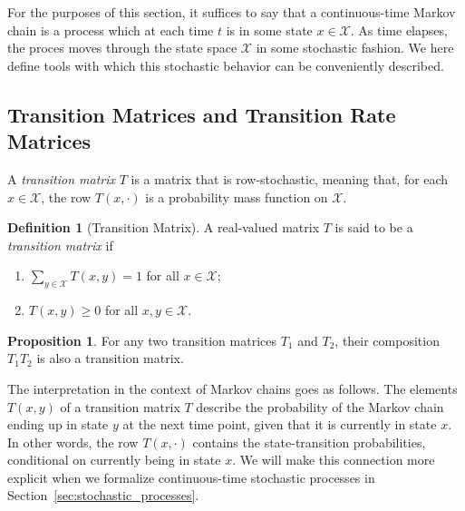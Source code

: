 \documentclass[10pt,a4paper]{paper}
\theoremstyle{definition}
\newtheorem{proposition}[theorem]{Proposition}
\newtheorem{definition}{Definition}
\newcommand{\states}{\mathcal{X}}
\begin{document}
For the purposes of this section, it suffices to say that a continuous-time Markov chain is a process which at each time $t$ is in some state $x\in\states$. As time elapses, the proces moves through the state space $\states$ in some stochastic fashion. We here define tools with which this stochastic behavior can be conveniently described.

\subsection{Transition Matrices and Transition Rate Matrices}\label{sec:trans_rate_matrices}

A \emph{transition matrix} $T$ is a matrix that is row-stochastic, meaning that, for each $x\in\states$, the row $T(x,\cdot)$ is a probability mass function on $\states$.
\begin{definition}[Transition Matrix]\label{def:stoch_matrix}
A real-valued matrix $T$ is said to be a \emph{transition matrix} if
\vspace{5pt}
\begin{enumerate}[label=T\arabic*:,ref=T\arabic*]
\item\label{def:T:sumone}
$\sum_{y\in\states}T(x,y)=1$ for all $x\in\states$;\label{def:trans_matrix_is_stochastic}
\item\label{def:T:nonneg}
$T(x,y)\geq0$ for all $x,y\in\states$.
\end{enumerate}
\vspace{5pt}
\noindent
\end{definition}

\begin{proposition}\label{lemma:compositiontransitionmatrix}
For any two transition matrices $T_1$ and $T_2$, their composition $T_1T_2$ is also a transition matrix.
\end{proposition}

The interpretation in the context of Markov chains goes as follows. The elements $T(x,y)$ of a transition matrix $T$ describe the probability of the Markov chain ending up in state $y$ at the next time point, given that it is currently in state $x$. In other words, the row $T(x,\cdot)$ contains the state-transition probabilities, conditional on currently being in state $x$. We will make this connection more explicit when we formalize continuous-time stochastic processes in Section~\ref{sec:stochastic_processes}.
\end{document}
